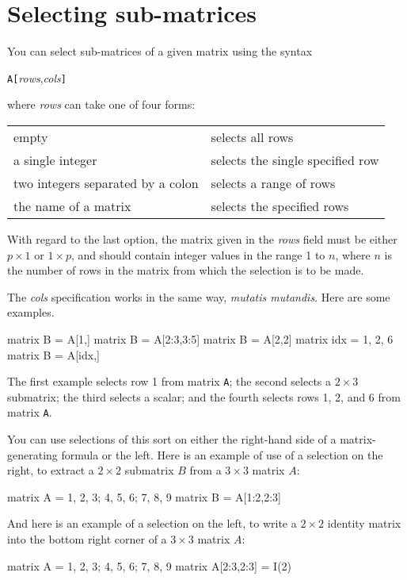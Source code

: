 \section{Selecting sub-matrices}
\label{matrix-sub}

You can select sub-matrices of a given matrix using the syntax

\texttt{A[}\textsl{rows},\textsl{cols}\texttt{]}

where \textsl{rows} can take one of four forms:

\begin{center}
\begin{tabular}{ll}
empty & selects all rows \\
a single integer & selects the single specified row \\
two integers separated by a colon & selects a range of rows \\
the name of a matrix & selects the specified rows
\end{tabular}
\end{center}

With regard to the last option, the matrix given in the \textsl{rows}
field must be either $p\times 1$ or $1\times p$, and should contain
integer values in the range 1 to $n$, where $n$ is the number of rows
in the matrix from which the selection is to be made.

The \textsl{cols} specification works in the same way, \textit{mutatis
  mutandis}.  Here are some examples.
%
\begin{code}
matrix B = A[1,]
matrix B = A[2:3,3:5]
matrix B = A[2,2]
matrix idx = { 1, 2, 6 }
matrix B = A[idx,]
\end{code}
%
The first example selects row 1 from matrix \texttt{A}; the second
selects a $2\times 3$ submatrix; the third selects a scalar; and
the fourth selects rows 1, 2, and 6 from matrix \texttt{A}.

You can use selections of this sort on either the right-hand side of
a matrix-generating formula or the left.  Here is an example of use of
a selection on the right, to extract a $2\times 2$ submatrix $B$ from a
$3\times 3$ matrix $A$:
%
\begin{code}
matrix A = { 1, 2, 3; 4, 5, 6; 7, 8, 9 }
matrix B = A[1:2,2:3]
\end{code}
%
And here is an example of a selection on the left, to write a $2\times
2$ identity matrix into the bottom right corner of a $3\times 3$
matrix $A$:
%
\begin{code}
matrix A = { 1, 2, 3; 4, 5, 6; 7, 8, 9 }
matrix A[2:3,2:3] = I(2)
\end{code}


